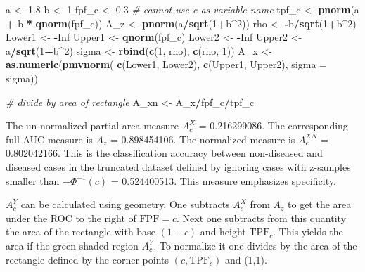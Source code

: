 \documentclass[
]{book}
\newenvironment{Shaded}{\begin{snugshade}}{\end{snugshade}}
\newcommand{\CommentTok}[1]{\textcolor[rgb]{0.56,0.35,0.01}{\textit{#1}}}
\newcommand{\DataTypeTok}[1]{\textcolor[rgb]{0.13,0.29,0.53}{#1}}
\newcommand{\DecValTok}[1]{\textcolor[rgb]{0.00,0.00,0.81}{#1}}
\newcommand{\FloatTok}[1]{\textcolor[rgb]{0.00,0.00,0.81}{#1}}
\newcommand{\KeywordTok}[1]{\textcolor[rgb]{0.13,0.29,0.53}{\textbf{#1}}}
\newcommand{\NormalTok}[1]{#1}
\newcommand{\OperatorTok}[1]{\textcolor[rgb]{0.81,0.36,0.00}{\textbf{#1}}}
\newcommand{\OtherTok}[1]{\textcolor[rgb]{0.56,0.35,0.01}{#1}}
\newcommand{\StringTok}[1]{\textcolor[rgb]{0.31,0.60,0.02}{#1}}
\begin{document}
\begin{Shaded}
\begin{Highlighting}[numbers=left,,]
\NormalTok{a <-}\StringTok{ }\FloatTok{1.8}
\NormalTok{b <-}\StringTok{ }\DecValTok{1}
\NormalTok{fpf_c <-}\StringTok{ }\FloatTok{0.3} \CommentTok{# cannot use c as variable name}
\NormalTok{tpf_c <-}\StringTok{ }\KeywordTok{pnorm}\NormalTok{(a }\OperatorTok{+}\StringTok{ }\NormalTok{b }\OperatorTok{*}\StringTok{ }\KeywordTok{qnorm}\NormalTok{(fpf_c))}
\NormalTok{A_z <-}\StringTok{ }\KeywordTok{pnorm}\NormalTok{(a}\OperatorTok{/}\KeywordTok{sqrt}\NormalTok{(}\DecValTok{1}\OperatorTok{+}\NormalTok{b}\OperatorTok{^}\DecValTok{2}\NormalTok{))}
\NormalTok{rho <-}\StringTok{ }\OperatorTok{-}\NormalTok{b}\OperatorTok{/}\KeywordTok{sqrt}\NormalTok{(}\DecValTok{1}\OperatorTok{+}\NormalTok{b}\OperatorTok{^}\DecValTok{2}\NormalTok{)}
\NormalTok{Lower1 <-}\StringTok{ }\OperatorTok{-}\OtherTok{Inf}
\NormalTok{Upper1 <-}\StringTok{ }\KeywordTok{qnorm}\NormalTok{(fpf_c)}
\NormalTok{Lower2 <-}\StringTok{ }\OperatorTok{-}\OtherTok{Inf}
\NormalTok{Upper2 <-}\StringTok{ }\NormalTok{a}\OperatorTok{/}\KeywordTok{sqrt}\NormalTok{(}\DecValTok{1}\OperatorTok{+}\NormalTok{b}\OperatorTok{^}\DecValTok{2}\NormalTok{)}
\NormalTok{sigma <-}\StringTok{ }\KeywordTok{rbind}\NormalTok{(}\KeywordTok{c}\NormalTok{(}\DecValTok{1}\NormalTok{, rho), }\KeywordTok{c}\NormalTok{(rho, }\DecValTok{1}\NormalTok{))}
\NormalTok{A_x <-}\StringTok{ }\KeywordTok{as.numeric}\NormalTok{(}\KeywordTok{pmvnorm}\NormalTok{(}
  \KeywordTok{c}\NormalTok{(Lower1, Lower2), }
  \KeywordTok{c}\NormalTok{(Upper1, Upper2), }
  \DataTypeTok{sigma =}\NormalTok{ sigma))}

\CommentTok{# divide by area of rectangle}
\NormalTok{A_xn <-}\StringTok{ }\NormalTok{A_x}\OperatorTok{/}\NormalTok{fpf_c}\OperatorTok{/}\NormalTok{tpf_c}
\end{Highlighting}
\end{Shaded}

The un-normalized partial-area measure \(A_c^{X}\) = 0.216299086. The corresponding full AUC measure is \(A_z\) = 0.898454106. The normalized measure is \(A_c^{XN}\) = 0.802042166. This is the classification accuracy between non-diseased and diseased cases in the truncated dataset defined by ignoring cases with z-samples smaller than \(-\Phi^{-1}(c)\) = 0.524400513. This measure emphasizes specificity.

\(A_c^{Y}\) can be calculated using geometry. One subtracts \(A_c^{X}\) from \(A_z\) to get the area under the ROC to the right of \(\text{FPF}=c\). Next one subtracts from this quantity the area of the rectangle with base \((1 - c)\) and height \(\text{TPF}_c\). This yields the area if the green shaded region \(A_c^{Y}\). To normalize it one divides by the area of the rectangle defined by the corner points \((c,\text{TPF}_c)\) and (1,1).
\end{document}
